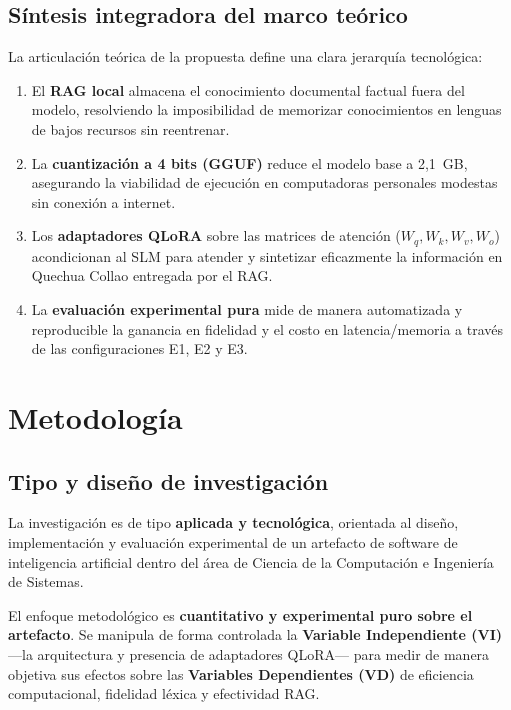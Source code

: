 \subsection{Síntesis integradora del marco teórico}
La articulación teórica de la propuesta define una clara jerarquía tecnológica:
\begin{enumerate}
    \item El \textbf{RAG local} almacena el conocimiento documental factual fuera del modelo, resolviendo la imposibilidad de memorizar conocimientos en lenguas de bajos recursos sin reentrenar.
    \item La \textbf{cuantización a 4 bits (GGUF)} reduce el modelo base a 2,1~GB, asegurando la viabilidad de ejecución en computadoras personales modestas sin conexión a internet.
    \item Los \textbf{adaptadores QLoRA} sobre las matrices de atención ($W_q, W_k, W_v, W_o$) acondicionan al SLM para atender y sintetizar eficazmente la información en Quechua Collao entregada por el RAG.
    \item La \textbf{evaluación experimental pura} mide de manera automatizada y reproducible la ganancia en fidelidad y el costo en latencia/memoria a través de las configuraciones E1, E2 y E3.
\end{enumerate}

\newpage

\section{Metodología}

\subsection{Tipo y diseño de investigación}
La investigación es de tipo \textbf{aplicada y tecnológica}, orientada al diseño, implementación y evaluación experimental de un artefacto de software de inteligencia artificial dentro del área de Ciencia de la Computación e Ingeniería de Sistemas.

El enfoque metodológico es \textbf{cuantitativo y experimental puro sobre el artefacto}. Se manipula de forma controlada la \textbf{Variable Independiente (VI)} ---la arquitectura y presencia de adaptadores QLoRA--- para medir de manera objetiva sus efectos sobre las \textbf{Variables Dependientes (VD)} de eficiencia computacional, fidelidad léxica y efectividad RAG.


